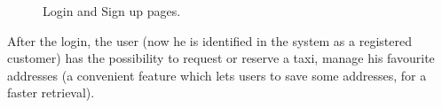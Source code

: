 \begin{figure}
	\hfill%
	\caption{Login and Sign up pages.}\label{fig:loginSignup}
\end{figure}

After the login, the user (now he is identified in the system as a registered customer) has the possibility to request or reserve a taxi, manage his favourite addresses (a convenient feature which lets users to save some addresses, for a faster retrieval).

